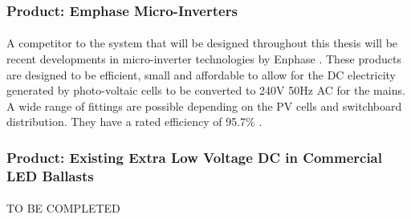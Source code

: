 \subsubsection{Product: Emphase Micro-Inverters}

\paragraph{}
A competitor to the system that will be designed throughout this thesis will be recent developments in micro-inverter technologies by Enphase \cite{website:Enphase}. These products are designed to be efficient, small and affordable to allow for the DC electricity generated by photo-voltaic cells to be converted to 240V 50Hz AC for the mains. A wide range of fittings are possible depending on the PV cells and switchboard distribution. They have a rated efficiency of 95.7\% \cite{website:Enphase}. 

\subsubsection{Product: Existing Extra Low Voltage DC in Commercial LED Ballasts}

\paragraph{}
TO BE COMPLETED
 
\newpage